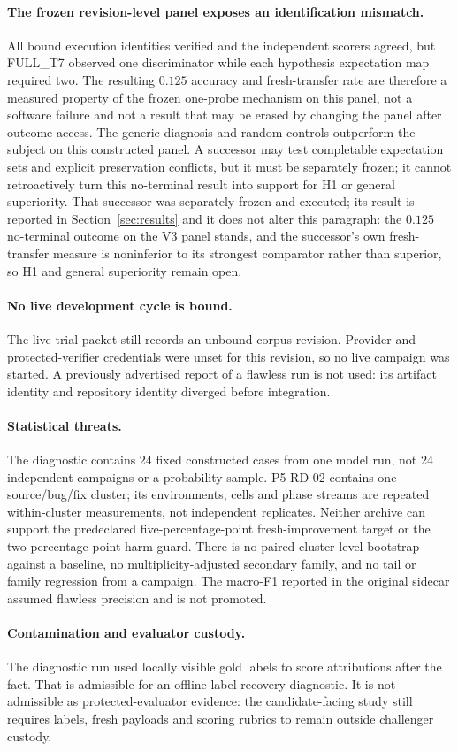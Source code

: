 \paragraph{The frozen revision-level panel exposes an identification mismatch.}
All bound execution identities verified and the independent scorers agreed,
but FULL\_T7 observed one discriminator while each hypothesis expectation map
required two. The resulting $0.125$ accuracy and fresh-transfer rate are
therefore a measured property of the frozen one-probe mechanism on this panel,
not a software failure and not a result that may be erased by changing the
panel after outcome access. The generic-diagnosis and random controls outperform
the subject on this constructed panel. A successor may test completable
expectation sets and explicit preservation conflicts, but it must be separately
frozen; it cannot retroactively turn this no-terminal result into support for
H1 or general superiority. That successor was separately frozen and executed;
its result is reported in Section~\ref{sec:results} and it does not alter this
paragraph: the $0.125$ no-terminal outcome on the V3 panel stands, and the
successor's own fresh-transfer measure is noninferior to its strongest
comparator rather than superior, so H1 and general superiority remain open.

\paragraph{No live development cycle is bound.}
The live-trial packet still records an unbound corpus revision. Provider and protected-verifier credentials were unset for this revision, so no live campaign was started. A previously advertised report of a flawless run is not used: its artifact identity and repository identity diverged before integration.

\paragraph{Statistical threats.}
The diagnostic contains 24 fixed constructed cases from one model run, not 24
independent campaigns or a probability sample. P5-RD-02 contains one
source/bug/fix cluster; its environments, cells and phase streams are repeated
within-cluster measurements, not independent replicates. Neither archive can
support the predeclared five-percentage-point fresh-improvement target or the
two-percentage-point harm guard. There is no paired cluster-level bootstrap
against a baseline, no multiplicity-adjusted secondary family, and no tail or
family regression from a campaign. The macro-F1 reported in the original
sidecar assumed flawless precision and is not promoted.

\paragraph{Contamination and evaluator custody.}
The diagnostic run used locally visible gold labels to score attributions after the fact. That is admissible for an offline label-recovery diagnostic. It is not admissible as protected-evaluator evidence: the candidate-facing study still requires labels, fresh payloads and scoring rubrics to remain outside challenger custody.
